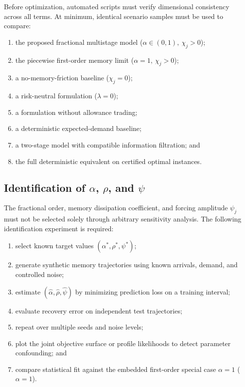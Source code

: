 \documentclass[11pt,a4paper]{article}
\begin{document}
Before optimization, automated scripts must verify dimensional
consistency across all terms. At minimum, identical scenario samples
must be used to compare:
\begin{enumerate}
  \item the proposed fractional multistage model
  (\(\alpha\in(0,1),\ \chi_j>0\));
  \item the piecewise first-order memory limit
  (\(\alpha=1,\ \chi_j>0\));
  \item a no-memory-friction baseline (\(\chi_j=0\));
  \item a risk-neutral formulation (\(\lambda=0\));
  \item a formulation without allowance trading;
  \item a deterministic expected-demand baseline;
  \item a two-stage model with compatible information filtration; and
  \item the full deterministic equivalent on certified optimal
  instances.
\end{enumerate}

\subsection{Identification of \texorpdfstring{\(\alpha\)}{alpha},
\texorpdfstring{\(\rho\)}{rho}, and \texorpdfstring{\(\psi\)}{psi}}

The fractional order, memory dissipation coefficient, and forcing
amplitude \(\psi_j\) must not be
selected solely through arbitrary sensitivity analysis. The following
identification experiment is required:
\begin{enumerate}
  \item select known target values \((\alpha^{*},\rho^{*},\psi^{*})\);
  \item generate synthetic memory trajectories using known arrivals,
  demand, and controlled noise;
  \item estimate \((\widehat\alpha,\widehat\rho,\widehat\psi)\) by minimizing prediction loss on a
  training interval;
  \item evaluate recovery error on independent test trajectories;
  \item repeat over multiple seeds and noise levels;
  \item plot the joint objective surface or profile likelihoods to detect
  parameter confounding; and
  \item compare statistical fit against the embedded first-order special case $\alpha=1$
  (\(\alpha=1\)).
\end{enumerate}
\end{document}
